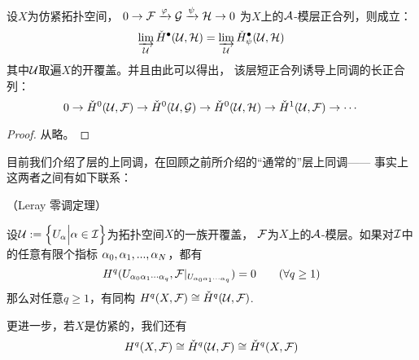 \begin{thm}
设$X$为仿紧拓扑空间，
$0\to\mathcal{F}\xrightarrow{\varphi}\mathcal{G}\xrightarrow{\psi}\mathcal{H}\to 0$
为$X$上的$\mathcal{A}$-模层正合列，则成立：
$$
  \varinjlim_{\mathcal{U}}\check{H}^{\bullet}(\mathcal{U},\mathcal{H})
= \varinjlim_{\mathcal{U}}\check{H}^{\bullet}_\psi(\mathcal{U},\mathcal{H})
$$
其中$\mathcal{U}$取遍$X$的开覆盖。并且由此可以得出，
该层短正合列诱导\Cech 上同调的长正合列：
$$
 0\to\check{H}^0(\mathcal{U},\mathcal{F})
  \to\check{H}^0(\mathcal{U},\mathcal{G})
  \to\check{H}^0(\mathcal{U},\mathcal{H})
  \to\check{H}^1(\mathcal{U},\mathcal{F})
  \to\cdots
$$
\end{thm}

\begin{proof}
从略。
\end{proof}


目前我们介绍了层的\Cech 上同调，在回顾之前所介绍的“通常的”层上同调——
事实上这两者之间有如下联系：

\begin{thm}（Leray 零调定理）

设$\mathcal{U}:=\Big\{ U_\alpha \Big| \alpha\in\mathcal{I} \Big\}$为拓扑空间$X$的一族开覆盖，
$\mathcal{F}$为$X$上的$\mathcal{A}$-模层。如果对$\mathcal{I}$中的任意有限个指标
$\alpha_0,\alpha_1,...,\alpha_N$，都有
$$
  H^q(U_{\alpha_0\alpha_1\cdots\alpha_q},
     \mathcal{F}|_{U_{\alpha_0\alpha_1\cdots\alpha_q}})
=0\qquad
(\forall q\geq 1)
$$
那么对任意$q\geq 1$，有同构
$H^q(X,\mathcal{F})\cong \check{H}^q(\mathcal{U},\mathcal{F})$.

更进一步，若$X$是仿紧的，我们还有
$$H^q(X,\mathcal{F})\cong \check{H}^q(\mathcal{U},\mathcal{F})
\cong\check{H}^q(X,\mathcal{F})$$
\end{thm}


